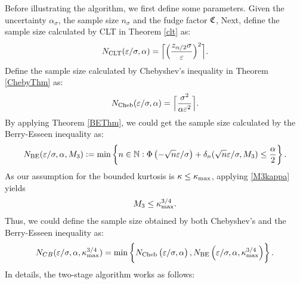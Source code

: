 \documentclass{iitthesis}
\begin{document}
 \label{sec:meanMCabsg}
Before illustrating the algorithm, we first define some parameters. Given the uncertainty $\alpha_{\sigma}$, the sample size $n_{\sigma}$ and the fudge factor $\mathfrak{C}$, 
Next, define the sample size calculated by CLT in Theorem \ref{clt} as:
\begin{equation}\label{NCLT}
N_{\mathrm{CLT}}(\varepsilon/\sigma,\alpha)
= 
\Bigl\lceil
\Bigl(
\frac{z_{\alpha/2}\sigma}{\varepsilon}
\Bigr)^2
\Bigr\rceil.
\end{equation}
Define the sample size calculated by Chebyshev's inequality in Theorem \ref{ChebyThm} as:
\begin{equation}\label{NCheby}
N_{\text{Cheb}}(\varepsilon/\sigma,\alpha)
= 
\Bigl\lceil\frac{\sigma^2}{\alpha\varepsilon^2}\Bigr\rceil.
\end{equation}
By applying Theorem \ref{BEThm}, we could get the sample size calculated by the Berry-Esseen inequality as:
\begin{equation}\label{NBE}
N_{\text{BE}}(\varepsilon/\sigma,\alpha,M_3) := \min \left \{ n \in \mathbb{N} : \Phi\left(-\sqrt{n}\varepsilon/\sigma  \right)+\delta_n(\sqrt{n}\varepsilon/\sigma,M_3)
\le \frac{\alpha}{2} \right \}.
\end{equation}
As our assumption for the bounded kurtosis is $\kappa \leq \kappa_{\max}$, applying \eqref{M3kappa} yields 
\begin{align}\label{M3kmax}
M_3 \leq \kappa_{\max}^{3/4}.
\end{align}
Thus, we could define the sample size obtained by both Chebyshev's and the Berry-Esseen inequality as:
\begin{align}\label{NCB}
N_{CB} (\varepsilon/\sigma,\alpha, \kappa_{\max}^{3/4})  = \min \left \{ N_{\text{Cheb}}\left(\varepsilon/\sigma,\alpha\right),N_{\text{BE}}\left(\varepsilon/\sigma,\alpha, \kappa_{\max}^{3/4}\right)\right \}.
\end{align}
In details, the two-stage algorithm works as follows:
\end{document}
